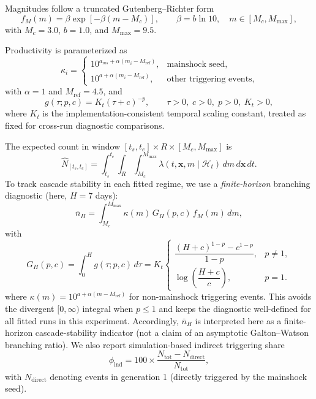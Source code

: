 \documentclass[12pt,letterpaper]{article}
\newcommand{\Mc}{M_c}
\begin{document}
Magnitudes follow a truncated Gutenberg--Richter form
\begin{equation}
f_M(m)=\beta \exp\!\left[-\beta (m-\Mc)\right], \qquad
\beta = b \ln 10,\quad m\in[\Mc,M_{\max}],
\label{eq:gr_density}
\end{equation}
with $\Mc=3.0$, $b=1.0$, and $M_{\max}=9.5$.

Productivity is parameterized as
\begin{equation}
\kappa_i=
\begin{cases}
10^{a_{ms}+\alpha(m_i-M_{\mathrm{ref}})}, & \text{mainshock seed},\\[2pt]
10^{a+\alpha(m_i-M_{\mathrm{ref}})},      & \text{other triggering events},
\end{cases}
\label{eq:productivity}
\end{equation}
with $\alpha=1$ and $M_{\mathrm{ref}}=4.5$, and
\begin{equation}
g(\tau;p,c)=K_t(\tau+c)^{-p}, \qquad \tau>0,\; c>0,\; p>0,\; K_t>0,
\label{eq:omori_kernel}
\end{equation}
where $K_t$ is the implementation-consistent temporal scaling constant, treated
as fixed for cross-run diagnostic comparisons.

The expected count in window
$[t_s,t_e]\times R\times[\Mc,M_{\max}]$ is
\begin{equation}
\hat N_{[t_s,t_e]} =
\int_{t_s}^{t_e}\!\!\int_R\!\!\int_{\Mc}^{M_{\max}}
\lambda(t,\mathbf{x},m \mid \mathcal{H}_t)\,dm\,d\mathbf{x}\,dt.
\label{eq:expected_count}
\end{equation}
To track cascade stability in each fitted regime, we use a
\emph{finite-horizon} branching diagnostic (here, $H=7$ days):
\begin{equation}
\bar n_H =
\int_{\Mc}^{M_{\max}}
\kappa(m)\,G_H(p,c)\,f_M(m)\,dm,
\label{eq:branching_ratio}
\end{equation}
with
\begin{equation}
G_H(p,c)=\int_0^H g(\tau;p,c)\,d\tau
=
K_t
\begin{cases}
\dfrac{(H+c)^{1-p}-c^{1-p}}{1-p}, & p\neq 1,\\[8pt]
\log\!\left(\dfrac{H+c}{c}\right), & p=1.
\end{cases}
\label{eq:kernel_mass_h}
\end{equation}
where $\kappa(m)=10^{a+\alpha(m-M_{\mathrm{ref}})}$ for non-mainshock
triggering events. This avoids the divergent $[0,\infty)$ integral when
$p\le1$ and keeps the diagnostic well-defined for all fitted runs in this
experiment. Accordingly, $\bar n_H$ is interpreted here as a finite-horizon
cascade-stability indicator (not a claim of an asymptotic Galton--Watson
branching ratio). We also report simulation-based indirect triggering share
\begin{equation}
\phi_{\mathrm{ind}} =
100\times\frac{N_{\mathrm{tot}}-N_{\mathrm{direct}}}{N_{\mathrm{tot}}},
\label{eq:indirect_share}
\end{equation}
with $N_{\mathrm{direct}}$ denoting events in generation 1
(directly triggered by the mainshock seed).
\end{document}
